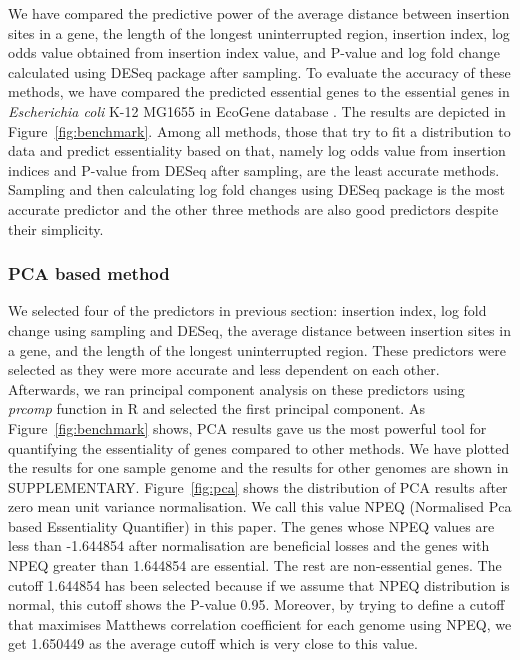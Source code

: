\documentclass[12pt,letterpaper]{article}
\begin{document}
We have compared the predictive power of the average distance between insertion sites in a gene, the length of the longest uninterrupted region, insertion index, log odds value obtained from insertion index value, and P-value and log fold change calculated using DESeq package after sampling. To evaluate the accuracy of these methods, we have compared the predicted essential genes to the essential genes in \textit{Escherichia coli} K-12 MG1655 in EcoGene database \cite{zhou_ecogene_2013}. The results are depicted in Figure~\ref{fig:benchmark}. Among all methods, those that try to fit a distribution to data and predict essentiality based on that, namely log odds value from insertion indices and P-value from DESeq after sampling, are the least accurate methods. Sampling and then calculating log fold changes using DESeq package is the most accurate predictor and the other three methods are also good predictors despite their simplicity.
\subsubsection{PCA based method}\label{sec:essentiality-call}
We selected four of the predictors in previous section: insertion index, log fold change using sampling and DESeq, the average distance between insertion sites in a gene, and the length of the longest uninterrupted region. These predictors were selected as they were more accurate and less dependent on each other. Afterwards, we ran principal component analysis on these predictors using \emph{prcomp} function in R and selected the first principal component. As Figure~\ref{fig:benchmark} shows, PCA results gave us the most powerful tool for quantifying the essentiality of genes compared to other methods. We have plotted the results for one sample genome and the results for other genomes are shown in {\color{red}SUPPLEMENTARY}. Figure~\ref{fig:pca} shows the distribution of PCA results after zero mean unit variance normalisation. We call this value NPEQ (Normalised Pca based Essentiality Quantifier) in this paper. The genes whose NPEQ values are less than -1.644854 after normalisation are beneficial losses and the genes with NPEQ greater than 1.644854 are essential. The rest are non-essential genes. The cutoff 1.644854 has been selected because if we assume that NPEQ distribution is normal, this cutoff shows the P-value 0.95. Moreover, by trying to define a cutoff that maximises Matthews correlation coefficient for each genome using NPEQ, we get 1.650449 as the average cutoff which is very close to this value.
\end{document}
